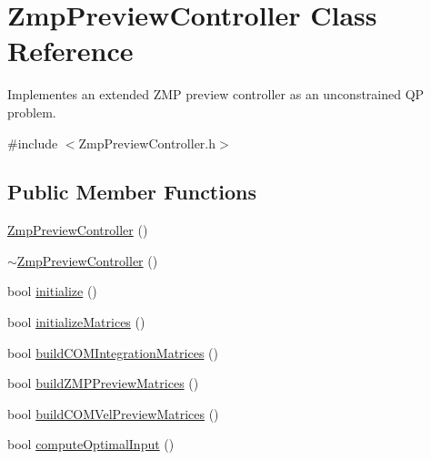 \hypertarget{classZmpPreviewController}{}\section{Zmp\+Preview\+Controller Class Reference}
\label{classZmpPreviewController}


Implementes an extended Z\+MP preview controller as an unconstrained QP problem.  




{\ttfamily \#include $<$Zmp\+Preview\+Controller.\+h$>$}

\subsection*{Public Member Functions}
\begin{DoxyCompactItemize}
\item 
\hyperlink{classZmpPreviewController_ac8837fd39b0b942afd3dd5759c456b42}{Zmp\+Preview\+Controller} ()
\item 
\hyperlink{classZmpPreviewController_af702c45f318c7a78310d19cc061886dd}{$\sim$\+Zmp\+Preview\+Controller} ()
\item 
bool \hyperlink{classZmpPreviewController_ac28287e01187bff2cea5a68292d936bd}{initialize} ()
\item 
bool \hyperlink{classZmpPreviewController_a65905572c73752a3ff46c0435c9794a0}{initialize\+Matrices} ()
\item 
bool \hyperlink{classZmpPreviewController_a378a6408072c1d7b962e8e52af30b634}{build\+C\+O\+M\+Integration\+Matrices} ()
\item 
bool \hyperlink{classZmpPreviewController_aadf1b7cba1ac0a1e6ec3bc8e0b761d02}{build\+Z\+M\+P\+Preview\+Matrices} ()
\item 
bool \hyperlink{classZmpPreviewController_aa763d1c7a769f21eeaaaeb3f09a32aef}{build\+C\+O\+M\+Vel\+Preview\+Matrices} ()
\item 
bool \hyperlink{classZmpPreviewController_a321140d8b3d99cf82687c444344c161d}{compute\+Optimal\+Input} ()
\end{DoxyCompactItemize}
